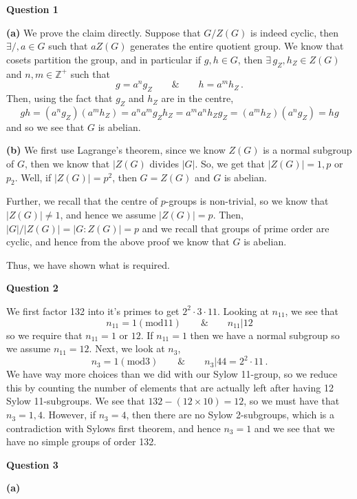 \documentclass[10pt]{article}
\newcommand{\Z}{\mathbb{Z}}
\begin{document}
\textbf{Question 1}

\textbf{(a)} We prove the claim directly. Suppose that $G/Z(G)$ is indeed cyclic, then $\exists /, a\in G$ such that $aZ(G)$ generates the entire quotient group. We know that cosets partition the group, and in particular if $g,h\in G$, then $\exists \, g_{Z}, h_{Z} \in Z(G)$ and $n,m\in \Z^{+}$ such that
\[ g = a^{n}g_{Z} \hspace{2em} \& \hspace{2em} h = a^{m}h_{Z} \, .\]
Then, using the fact that $g_{Z}$ and $h_{Z}$ are in the centre, 
\[ gh = (a^{n}g_{Z})(a^{m}h_{Z}) = a^{n}a^{m}g_{Z}h_{Z} = a^{m}a^{n}h_{Z}g_{Z} = (a^{m}h_{Z})(a^{n}g_{Z}) = hg \]
and so we see that $G$ is abelian.

\textbf{(b)} We first use Lagrange's theorem, since we know $Z(G)$ is a normal subgroup of $G$, then we know that $|Z(G)$ divides $|G|$. So, we get that $|Z(G)| = 1, p$ or $p_{2}$. Well, if $|Z(G)| = p^{2}$, then $G = Z(G)$ and $G$ is abelian.

Further, we recall that the centre of $p$-groups is non-trivial, so we know that $|Z(G)|\neq 1$, and hence we assume $|Z(G)| = p$. Then, $|G|/|Z(G)| = |G:Z(G)| = p$ and we recall that groups of prime order are cyclic, and hence from the above proof we know that $G$ is abelian.

Thus, we have shown what is required.


\newpage
\textbf{Question 2}

We first factor 132 into it's primes to get $2^{2}\cdot 3\cdot 11$. Looking at $n_{11}$, we see that
\[ n_{11} = 1 (\text{mod} 11) \hspace{2em} \& \hspace{2em} n_{11} | 12 \]
so we require that $n_{11} = 1$ or $12$. If $n_{11} = 1$ then we have a normal subgroup so we assume $n_{11} = 12$. Next, we look at $n_{3}$,
\[ n_{3} = 1 (\text{mod} 3) \hspace{2em} \& \hspace{2em} n_{3} | 44 = 2^{2} \cdot 11 \, .\]
We have way more choices than we did with our Sylow 11-group, so we reduce this by counting the number of elements that are actually left after having 12 Sylow 11-subgroups. We see that $132 - (12 \times 10) = 12$, so we must have that $n_{3} = 1, 4$. However, if $n_{3} = 4$, then there are no Sylow 2-subgroups, which is a contradiction with Sylows first theorem, and hence $n_{3} = 1$ and we see that we have no simple groups of order 132.

\newpage
\textbf{Question 3}

\textbf{(a)} 
\end{document}
